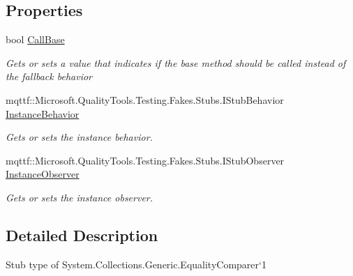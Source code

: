 \subsection*{Properties}
\begin{DoxyCompactItemize}
\item 
bool \hyperlink{class_system_1_1_collections_1_1_generic_1_1_fakes_1_1_stub_equality_comparer_3_01_t_01_4_af7c53d68d6ebd16ecbe08095f1b4b7e7}{Call\-Base}
\begin{DoxyCompactList}\small\item\em Gets or sets a value that indicates if the base method should be called instead of the fallback behavior\end{DoxyCompactList}\item 
mqttf\-::\-Microsoft.\-Quality\-Tools.\-Testing.\-Fakes.\-Stubs.\-I\-Stub\-Behavior \hyperlink{class_system_1_1_collections_1_1_generic_1_1_fakes_1_1_stub_equality_comparer_3_01_t_01_4_ad00447b05ab59859303ed88e565455d4}{Instance\-Behavior}
\begin{DoxyCompactList}\small\item\em Gets or sets the instance behavior.\end{DoxyCompactList}\item 
mqttf\-::\-Microsoft.\-Quality\-Tools.\-Testing.\-Fakes.\-Stubs.\-I\-Stub\-Observer \hyperlink{class_system_1_1_collections_1_1_generic_1_1_fakes_1_1_stub_equality_comparer_3_01_t_01_4_a248914a14a498b3ee2876b76883cebfd}{Instance\-Observer}
\begin{DoxyCompactList}\small\item\em Gets or sets the instance observer.\end{DoxyCompactList}\end{DoxyCompactItemize}


\subsection{Detailed Description}
Stub type of System.\-Collections.\-Generic.\-Equality\-Comparer`1



